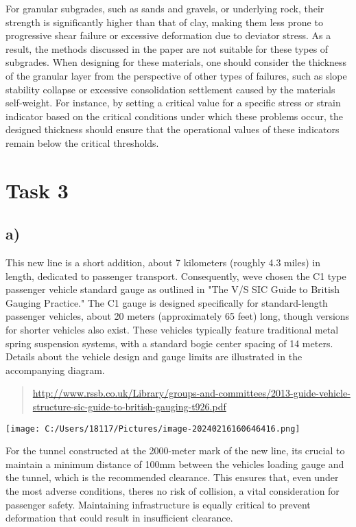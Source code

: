 \documentclass[
]{article}
\begin{document}
For granular subgrades, such as sands and gravels, or underlying rock,
their strength is significantly higher than that of clay, making them
less prone to progressive shear failure or excessive deformation due to
deviator stress. As a result, the methods discussed in the paper are not
suitable for these types of subgrades. When designing for these
materials, one should consider the thickness of the granular layer from
the perspective of other types of failures, such as slope stability
collapse or excessive consolidation settlement caused by the
material\textquotesingle s self-weight. For instance, by setting a
critical value for a specific stress or strain indicator based on the
critical conditions under which these problems occur, the designed
thickness should ensure that the operational values of these indicators
remain below the critical thresholds.

\section{Task 3}\label{task-3}

\subsection{a)}\label{a-2}

This new line is a short addition, about 7 kilometers (roughly 4.3
miles) in length, dedicated to passenger transport. Consequently,
we\textquotesingle ve chosen the C1 type passenger vehicle standard
gauge as outlined in "The V/S SIC Guide to British Gauging Practice."
The C1 gauge is designed specifically for standard-length passenger
vehicles, about 20 meters (approximately 65 feet) long, though versions
for shorter vehicles also exist. These vehicles typically feature
traditional metal spring suspension systems, with a standard bogie
center spacing of 14 meters. Details about the vehicle design and gauge
limits are illustrated in the accompanying diagram.

\begin{quote}
\url{http://www.rssb.co.uk/Library/groups-and-committees/2013-guide-vehicle-structure-sic-guide-to-british-gauging-t926.pdf}
\end{quote}

\texttt{[image: C:/Users/18117/Pictures/image-20240216160646416.png]}

For the tunnel constructed at the 2000-meter mark of the new line,
it\textquotesingle s crucial to maintain a minimum distance of 100mm
between the vehicle\textquotesingle s loading gauge and the tunnel,
which is the recommended clearance. This ensures that, even under the
most adverse conditions, there\textquotesingle s no risk of collision, a
vital consideration for passenger safety. Maintaining infrastructure is
equally critical to prevent deformation that could result in
insufficient clearance.
\end{document}
